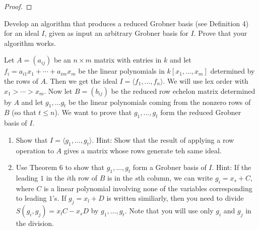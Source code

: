\begin{proof}
\end{proof}

\begin{tcolorbox}[title=Problem 8, breakable]
    Develop an algorithm that produces a reduced Grobner 
    basis (see Definition 4) for an ideal $I$,
    given as input an arbitrary Grobner basis for $I$.
    Prove that your algorithm works.
\end{tcolorbox}

\begin{tcolorbox}[title=Problem 10, breakable]
    Let $A = (a_{i j})$ be an $n \times m$ matrix with entries in $k$
    and let $f_i = a_{i 1} x_1 + \cdots + a_{i m} x_m$ be the linear 
    polynomials in $k[x_1, \ldots, x_m]$ determined by the rows of $A$.
    Then we get the ideal $I = \langle f_1, \ldots, f_n \rangle$. We 
    will use lex order with $x_1 > \cdots > x_m$. Now let 
    $B = (b_{i j})$ be the reduced row echelon matrix determined by $A$ and let 
    $g_1, \ldots g_t$ be the linear polynomials coming from the nonzero 
    rows of $B$ (so that $t \le n$). We want to prove that $g_1, \ldots, g_t$
    form the reduced Grobner basis of $I$.
    \begin{enumerate}
        \item Show that $I = \langle g_1, \ldots, g_t \rangle$.
        Hint: Show that the result of applying a row operation to 
        $A$ gives a matrix whose rows generate teh same ideal.
        \item Use Theorem 6 to show that $g_1, \ldots, g_t$ form a Grobner basis of $I$.
        Hint: If the leading $1$ in the $i$th row of $B$ is in the $s$th column,
        we can write $g_i = x_s + C$, where $C$ is a linear polynomial involving 
        none of the variables corresponding to leading $1$'s.
        If $g_j = x_l + D$ is written similiarly, then you need to divide 
        $S(g_i, g_j) = x_l C - x_s D$ by $g_1, \ldots, g_t$. Note that you 
        will use only $g_i$ and $g_j$ in the division.
    \end{enumerate}
\end{tcolorbox}

